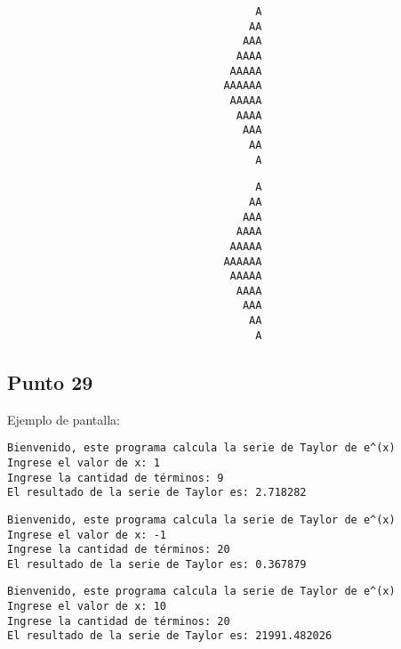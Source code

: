 \begin{lstlisting}
                                       A
                                      AA
                                     AAA
                                    AAAA
                                   AAAAA
                                  AAAAAA
                                   AAAAA
                                    AAAA
                                     AAA
                                      AA
                                       A
\end{lstlisting}

\begin{lstlisting}
                                       A
                                      AA
                                     AAA
                                    AAAA
                                   AAAAA
                                  AAAAAA
                                   AAAAA
                                    AAAA
                                     AAA
                                      AA
                                       A
\end{lstlisting}




\subsection{Punto 29}
	
	Ejemplo de pantalla:
\begin{lstlisting}
Bienvenido, este programa calcula la serie de Taylor de e^(x)
Ingrese el valor de x: 1
Ingrese la cantidad de términos: 9
El resultado de la serie de Taylor es: 2.718282
\end{lstlisting}

\begin{lstlisting}
Bienvenido, este programa calcula la serie de Taylor de e^(x)
Ingrese el valor de x: -1
Ingrese la cantidad de términos: 20
El resultado de la serie de Taylor es: 0.367879
\end{lstlisting}

\begin{lstlisting}
Bienvenido, este programa calcula la serie de Taylor de e^(x)
Ingrese el valor de x: 10
Ingrese la cantidad de términos: 20
El resultado de la serie de Taylor es: 21991.482026
\end{lstlisting}

